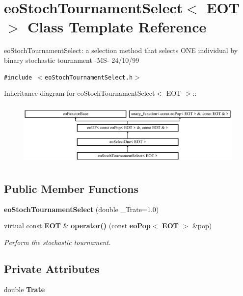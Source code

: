 \section{eo\-Stoch\-Tournament\-Select$<$ EOT $>$ Class Template Reference}
\label{classeo_stoch_tournament_select}
eo\-Stoch\-Tournament\-Select: a selection method that selects ONE individual by binary stochastic tournament -MS- 24/10/99  


{\tt \#include $<$eo\-Stoch\-Tournament\-Select.h$>$}

Inheritance diagram for eo\-Stoch\-Tournament\-Select$<$ EOT $>$::\begin{figure}[H]
\begin{center}
\leavevmode
\includegraphics[height=3.23699cm]{classeo_stoch_tournament_select}
\end{center}
\end{figure}
\subsection*{Public Member Functions}
\begin{CompactItemize}
\item 
{\bf eo\-Stoch\-Tournament\-Select} (double \_\-Trate=1.0)\label{classeo_stoch_tournament_select_a0}

\item 
virtual const {\bf EOT} \& {\bf operator()} (const {\bf eo\-Pop}$<$ {\bf EOT} $>$ \&pop)\label{classeo_stoch_tournament_select_a1}

\begin{CompactList}\small\item\em Perform the stochastic tournament. \item\end{CompactList}\end{CompactItemize}
\subsection*{Private Attributes}
\begin{CompactItemize}
\item 
double {\bf Trate}\label{classeo_stoch_tournament_select_r0}

\end{CompactItemize}


